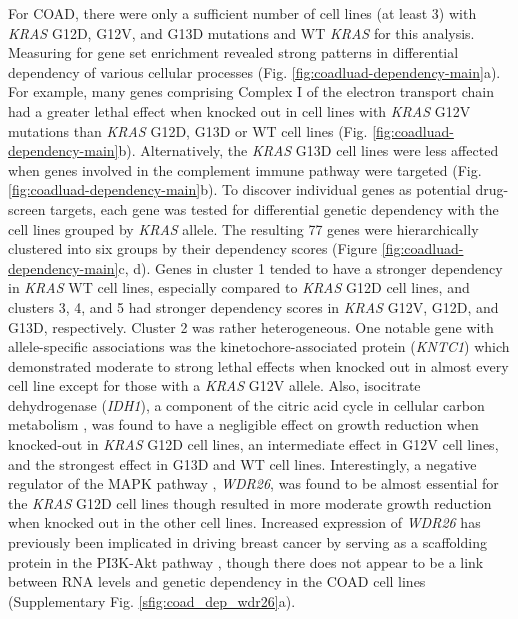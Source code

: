 \documentclass[english, 10pt, letterpaper]{article}
\newcommand{\KRAS}{\emph{KRAS}}
\begin{document}
For COAD, there were only a sufficient number of cell lines (at least 3) with \KRAS{} G12D, G12V, and G13D mutations and WT \KRAS{} for this analysis.
Measuring for gene set enrichment revealed strong patterns in differential dependency of various cellular processes (Fig. \ref{fig:coadluad-dependency-main}a).
For example, many genes comprising Complex I of the electron transport chain had a greater lethal effect when knocked out in cell lines with \KRAS{} G12V mutations than \KRAS{} G12D, G13D or WT cell lines (Fig. \ref{fig:coadluad-dependency-main}b).
Alternatively, the \KRAS{} G13D cell lines were less affected when genes involved in the complement immune pathway were targeted (Fig. \ref{fig:coadluad-dependency-main}b).
To discover individual genes as potential drug-screen targets, each gene was tested for differential genetic dependency with the cell lines grouped by \KRAS{} allele. 
The resulting 77 genes were hierarchically clustered into six groups by their dependency scores (Figure \ref{fig:coadluad-dependency-main}c, d).
Genes in cluster 1 tended to have a stronger dependency in \KRAS{} WT cell lines, especially compared to \KRAS{} G12D cell lines, and clusters 3, 4, and 5 had stronger dependency scores in \KRAS{} G12V, G12D, and G13D, respectively. 
Cluster 2 was rather heterogeneous.
One notable gene with allele-specific associations was the kinetochore-associated protein (\emph{KNTC1}) which demonstrated moderate to strong lethal effects when knocked out in almost every cell line except for those with a \KRAS{} G12V allele.
Also, isocitrate dehydrogenase (\emph{IDH1}), a component of the citric acid cycle in cellular carbon metabolism \cite{Geisbrecht1999TheDehydrogenase.}, was found to have a negligible effect on growth reduction when knocked-out in \KRAS{} G12D cell lines, an intermediate effect in G12V cell lines, and the strongest effect in G13D and WT cell lines.
Interestingly, a negative regulator of the MAPK pathway \cite{Goto2016WDR26Pathway.}, \emph{WDR26}, was found to be almost essential for the \KRAS{} G12D cell lines though resulted in more moderate growth reduction when knocked out in the other cell lines.
Increased expression of \emph{WDR26} has previously been implicated in driving breast cancer by serving as a scaffolding protein in the PI3K-Akt pathway \cite{Ye2016UpregulatedInvasion.}, though there does not appear to be a link between RNA levels and genetic dependency in the COAD cell lines (Supplementary Fig. \ref{sfig:coad_dep_wdr26}a).
\end{document}
